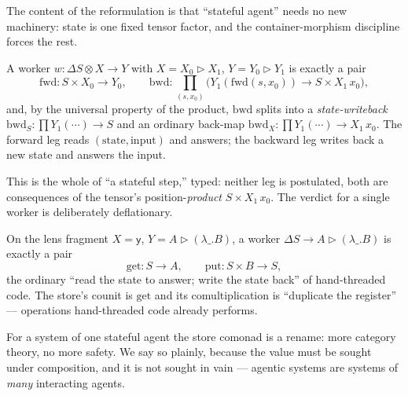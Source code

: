 The content of the reformulation is that ``stateful agent'' needs no new machinery: state is
one fixed tensor factor, and the container-morphism discipline forces the rest.

\begin{theorem}\label{thm:orch-unfold}
A worker $w:\Delta S\otimes X\to Y$ with $X=X_0\triangleright X_1$, $Y=Y_0\triangleright Y_1$ is
exactly a pair
\[
  \mathrm{fwd}:S\times X_0\to Y_0,
  \qquad
  \mathrm{bwd}:\textstyle\prod_{(s,x_0)}\big(Y_1(\mathrm{fwd}(s,x_0))\to S\times X_1\,x_0\big),
\]
and, by the universal property of the product, $\mathrm{bwd}$ splits into a
\emph{state-writeback} $\mathrm{bwd}_S:\prod Y_1(\cdots)\to S$ and an ordinary back-map
$\mathrm{bwd}_X:\prod Y_1(\cdots)\to X_1\,x_0$. The forward leg reads $(\text{state},\text{input})$
and answers; the backward leg writes back a new state and answers the input.
\end{theorem}

This is the whole of ``a stateful step,'' typed: neither leg is postulated, both are consequences
of the tensor's position-\emph{product} $S\times X_1\,x_0$. The verdict for a single worker is
deliberately deflationary.

\begin{proposition}\label{prop:orch-single}
On the lens fragment $X=\mathsf{y}$, $Y=A\triangleright(\lambda\_.B)$, a worker $\Delta S\to
A\triangleright(\lambda\_.B)$ is exactly a pair
\[
  \mathrm{get}:S\to A,\qquad \mathrm{put}:S\times B\to S,
\]
the ordinary ``read the state to answer; write the state back'' of hand-threaded code. The store's
counit is $\mathrm{get}$ and its comultiplication is ``duplicate the register'' --- operations
hand-threaded code already performs.
\end{proposition}

\begin{remark}\label{rem:orch-single-honest}
For a system of one stateful agent the store comonad is a rename: more category theory, no more
safety. We say so plainly, because the value must be sought under composition, and it is not sought
in vain --- agentic systems are systems of \emph{many} interacting agents.
\end{remark}

